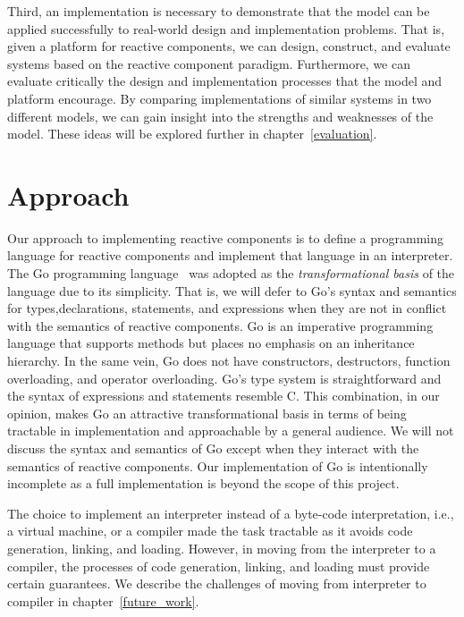 Third, an implementation is necessary to demonstrate that the model can be applied successfully to real-world design and implementation problems.
That is, given a platform for reactive components, we can design, construct, and evaluate systems based on the reactive component paradigm.
Furthermore, we can evaluate critically the design and implementation processes that the model and platform encourage.
By comparing implementations of similar systems in two different models, we can gain insight into the strengths and weaknesses of the model.
These ideas will be explored further in chapter~\ref{evaluation}.

\section{Approach}
Our approach to implementing reactive components is to define a programming language for reactive components and implement that language in an interpreter.
The Go programming language~\cite{go} was adopted as the \emph{transformational basis} of the language due to its simplicity.
That is, we will defer to Go's syntax and semantics for types,declarations, statements, and expressions when they are not in conflict with the semantics of reactive components.
Go is an imperative programming language that supports methods but places no emphasis on an inheritance hierarchy.
In the same vein, Go does not have constructors, destructors, function overloading, and operator overloading.
Go's type system is straightforward and the syntax of expressions and statements resemble C.
This combination, in our opinion, makes Go an attractive transformational basis in terms of being tractable in implementation and approachable by a general audience.
We will not discuss the syntax and semantics of Go except when they interact with the semantics of reactive components.
Our implementation of Go is intentionally incomplete as a full implementation is beyond the scope of this project.

The choice to implement an interpreter instead of a byte-code interpretation, i.e., a virtual machine, or a compiler made the task tractable as it avoids code generation, linking, and loading.
However, in moving from the interpreter to a compiler, the processes of code generation, linking, and loading must provide certain guarantees.
We describe the challenges of moving from interpreter to compiler in chapter~\ref{future_work}.

